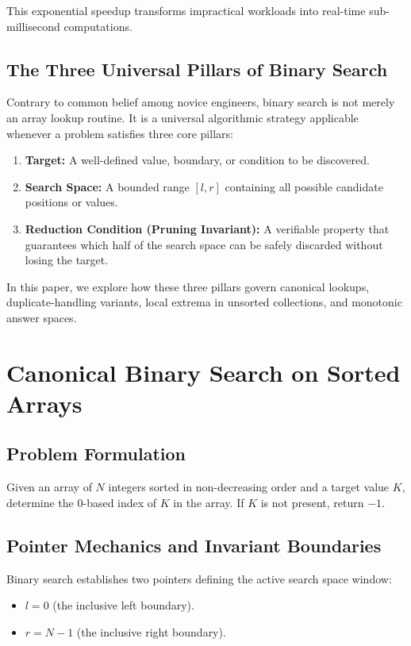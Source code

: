 \documentclass[10pt,journal,compsoc,onecolumn]{IEEEtran}
\begin{document}
This exponential speedup transforms impractical workloads into real-time sub-millisecond computations.

\subsection{The Three Universal Pillars of Binary Search}

Contrary to common belief among novice engineers, binary search is not merely an array lookup routine. It is a universal algorithmic strategy applicable whenever a problem satisfies three core pillars:
\begin{enumerate}
    \item \textbf{Target:} A well-defined value, boundary, or condition to be discovered.
    \item \textbf{Search Space:} A bounded range $[l, r]$ containing all possible candidate positions or values.
    \item \textbf{Reduction Condition (Pruning Invariant):} A verifiable property that guarantees which half of the search space can be safely discarded without losing the target.
\end{enumerate}

In this paper, we explore how these three pillars govern canonical lookups, duplicate-handling variants, local extrema in unsorted collections, and monotonic answer spaces.

\section{Canonical Binary Search on Sorted Arrays}
\label{sec:canonical}

\subsection{Problem Formulation}

Given an array of $N$ integers sorted in non-decreasing order and a target value $K$, determine the 0-based index of $K$ in the array. If $K$ is not present, return $-1$.

\subsection{Pointer Mechanics and Invariant Boundaries}

Binary search establishes two pointers defining the active search space window:
\begin{itemize}
    \item $l = 0$ (the inclusive left boundary).
    \item $r = N - 1$ (the inclusive right boundary).
\end{itemize}
\end{document}
